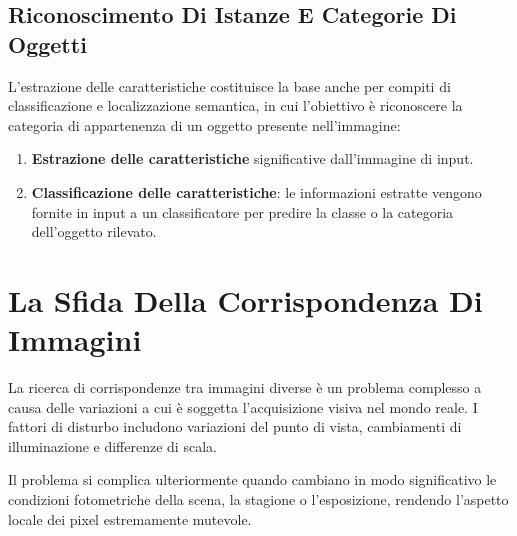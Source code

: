 ﻿\documentclass[11pt, a4paper]{article}
\begin{document}

\subsection{Riconoscimento Di Istanze E Categorie Di Oggetti}

L'estrazione delle caratteristiche costituisce la base anche per compiti di classificazione e localizzazione semantica, in cui l'obiettivo è riconoscere la categoria di appartenenza di un oggetto presente nell'immagine:
\begin{enumerate}[noitemsep]
    \item \textbf{Estrazione delle caratteristiche} significative dall'immagine di input.
    \item \textbf{Classificazione delle caratteristiche}: le informazioni estratte vengono fornite in input a un classificatore per predire la classe o la categoria dell'oggetto rilevato.
\end{enumerate}


\newpage

\section{La Sfida Della Corrispondenza Di Immagini}

La ricerca di corrispondenze tra immagini diverse è un problema complesso a causa delle variazioni a cui è soggetta l'acquisizione visiva nel mondo reale. I fattori di disturbo includono variazioni del punto di vista, cambiamenti di illuminazione e differenze di scala.


Il problema si complica ulteriormente quando cambiano in modo significativo le condizioni fotometriche della scena, la stagione o l'esposizione, rendendo l'aspetto locale dei pixel estremamente mutevole.

\end{document}
